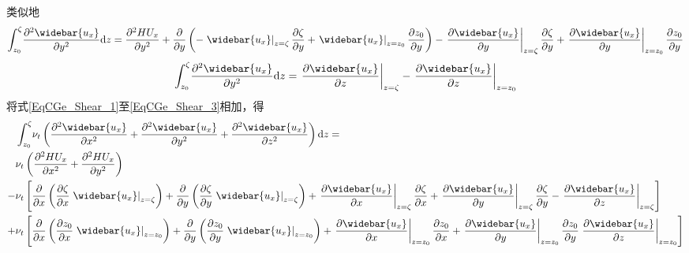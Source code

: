 类似地
\begin{equation}
    \int_{z_{0}}^{\zeta}\!
    \frac{\partial^{2} \widebar{u_{x}}}{\partial y^{2}}
    \mathrm{d}z
    =
    \frac{\partial^{2} HU_{x}}{\partial y^{2}} +
    \frac{\partial}{\partial y}
    \left(
    -
    \left.\widebar{u_{x}}\right|_{z=\zeta}\frac{\partial \zeta}{\partial y}
    +
    \left.\widebar{u_{x}}\right|_{z=z_{0}}\frac{\partial z_{0}}{\partial y}
    \right)
    -
    \left.\frac{\partial \widebar{u_{x}}}{\partial y}\right|_{z=\zeta}\frac{\partial \zeta}{\partial y}
    +
    \left.\frac{\partial \widebar{u_{x}}}{\partial y}\right|_{z=z_{0}}\frac{\partial z_{0}}{\partial y}
  \label{EqCGe_Shear_2}
\end{equation}
\begin{equation}
    \int_{z_{0}}^{\zeta}\!
    \frac{\partial^{2} \widebar{u_{x}}}{\partial y^{2}}
    \mathrm{d}z
    =
    \left.\frac{\partial \widebar{u_{x}}}{\partial z}\right|_{z=\zeta}
      -
      \left.\frac{\partial \widebar{u_{x}}}{\partial z}\right|_{z=z_{0}}
  \label{EqCGe_Shear_3}
\end{equation}
将式\eqref{EqCGe_Shear_1}至\eqref{EqCGe_Shear_3}相加，得
\begin{equation}
  \begin{aligned}
    &\int_{z_{0}}^{\zeta}\!
    \nu_{t}
    \left(
      \frac{\partial^{2} \widebar{u_{x}}}{\partial x^{2}} +
      \frac{\partial^{2} \widebar{u_{x}}}{\partial y^{2}} +
      \frac{\partial^{2} \widebar{u_{x}}}{\partial z^{2}}
    \right)
    \mathrm{d}z =\\
     &
    \nu_{t}
    \left(
    \frac{\partial^{2} HU_{x}}{\partial x^{2}} +
    \frac{\partial^{2} HU_{x}}{\partial y^{2}}
  \right)
  \\
      -&\nu_{t}
      \left[
    \frac{\partial}{\partial x}
    \left(
    \frac{\partial \zeta}{\partial x}
\left.\widebar{u_{x}}\right|_{z=\zeta}
\right)
+
    \frac{\partial}{\partial y}
    \left(
    \frac{\partial \zeta}{\partial y}
\left.\widebar{u_{x}}\right|_{z=\zeta}
\right)
+
\left.\frac{\partial \widebar{u_{x}}}{\partial x}\right|_{z=\zeta}
    \frac{\partial \zeta}{\partial x}
  +
\left.\frac{\partial \widebar{u_{x}}}{\partial y}\right|_{z=\zeta}
    \frac{\partial \zeta}{\partial y}
    -
    \left.\frac{\partial \widebar{u_{x}}}{\partial z}\right|_{z=\zeta}
        \right]
        \\
      +&\nu_{t}
      \left[
    \frac{\partial}{\partial x}
    \left(
    \frac{\partial z_{0}}{\partial x}
\left.\widebar{u_{x}}\right|_{z=z_{0}}
\right)
+
    \frac{\partial}{\partial y}
    \left(
    \frac{\partial z_{0}}{\partial y}
\left.\widebar{u_{x}}\right|_{z=z_{0}}
\right)
+
\left.\frac{\partial \widebar{u_{x}}}{\partial x}\right|_{z=z_{0}}
    \frac{\partial z_{0}}{\partial x}
  +
\left.\frac{\partial \widebar{u_{x}}}{\partial y}\right|_{z=z_{0}}
    \frac{\partial z_{0}}{\partial y}
    \left.\frac{\partial \widebar{u_{x}}}{\partial z}\right|_{z=z_{0}}
        \right]
  \end{aligned}
  \label{EqCGe_Shear_Total}
\end{equation}
